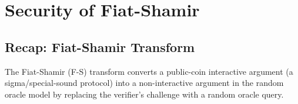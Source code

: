 \documentclass[11pt]{article}
\begin{document}
\section{Security of Fiat-Shamir}

\subsection{Recap: Fiat-Shamir Transform}

The Fiat-Shamir (F-S) transform converts a public-coin interactive argument
(a sigma/special-sound protocol) into a non-interactive argument in the random
oracle model by replacing the verifier's challenge with a random oracle query.
\end{document}
